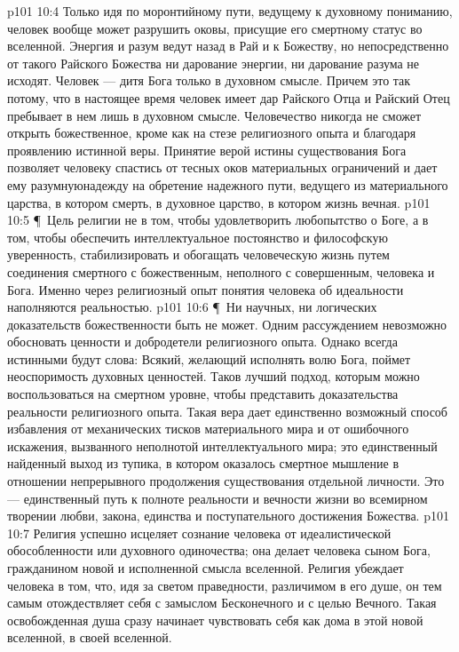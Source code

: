 \vs p101 10:4 Только идя по моронтийному пути, ведущему к духовному пониманию, человек вообще может разрушить оковы, присущие его смертному статус во вселенной. Энергия и разум ведут назад в Рай и к Божеству, но непосредственно от такого Райского Божества ни дарование энергии, ни дарование разума не исходят. Человек --- дитя Бога только в духовном смысле. Причем это так потому, что в настоящее время человек имеет дар Райского Отца и Райский Отец пребывает в нем лишь в духовном смысле. Человечество никогда не сможет открыть божественное, кроме как на стезе религиозного опыта и благодаря проявлению истинной веры. Принятие верой истины существования Бога позволяет человеку спастись от тесных оков материальных ограничений и дает ему разумнуюнадежду на обретение надежного пути, ведущего из материального царства, в котором смерть, в духовное царство, в котором жизнь вечная.
\vs p101 10:5 \P\ Цель религии не в том, чтобы удовлетворить любопытство о Боге, а в том, чтобы обеспечить интеллектуальное постоянство и философскую уверенность, стабилизировать и обогащать человеческую жизнь путем соединения смертного с божественным, неполного с совершенным, человека и Бога. Именно через религиозный опыт понятия человека об идеальности наполняются реальностью.
\vs p101 10:6 \P\ Ни научных, ни логических доказательств божественности быть не может. Одним рассуждением невозможно обосновать ценности и добродетели религиозного опыта. Однако всегда истинными будут слова: Всякий, желающий исполнять волю Бога, поймет неоспоримость духовных ценностей. Таков лучший подход, которым можно воспользоваться на смертном уровне, чтобы представить доказательства реальности религиозного опыта. Такая вера дает единственно возможный способ избавления от механических тисков материального мира и от ошибочного искажения, вызванного неполнотой интеллектуального мира; это единственный найденный выход из тупика, в котором оказалось смертное мышление в отношении непрерывного продолжения существования отдельной личности. Это --- единственный путь к полноте реальности и вечности жизни во всемирном творении любви, закона, единства и поступательного достижения Божества.
\vs p101 10:7 Религия успешно исцеляет сознание человека от идеалистической обособленности или духовного одиночества; она делает человека сыном Бога, гражданином новой и исполненной смысла вселенной. Религия убеждает человека в том, что, идя за светом праведности, различимом в его душе, он тем самым отождествляет себя с замыслом Бесконечного и с целью Вечного. Такая освобожденная душа сразу начинает чувствовать себя как дома в этой новой вселенной, в своей вселенной.

